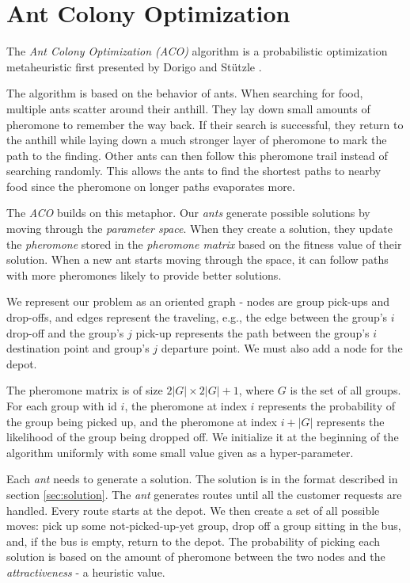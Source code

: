 
\chapter{Ant Colony Optimization}


The \textit{Ant Colony Optimization (ACO)} algorithm is a probabilistic optimization metaheuristic first presented by Dorigo and Stützle \cite{Dorigo2010}.

The algorithm is based on the behavior of ants. When searching for food, multiple ants scatter around their anthill. They lay down small amounts of pheromone to remember the way back. If their search is successful, they return to the anthill while laying down a much stronger layer of pheromone to mark the path to the finding. Other ants can then follow this pheromone trail instead of searching randomly. This allows the ants to find the shortest paths to nearby food since the pheromone on longer paths evaporates more.

The \textit{ACO} builds on this metaphor. Our \textit{ants} generate possible solutions by moving through the \textit{parameter space}. When they create a solution, they update the \textit{pheromone} stored in the \textit{pheromone matrix} based on the fitness value of their solution. When a new ant starts moving through the space, it can follow paths with more pheromones likely to provide better solutions.

We represent our problem as an oriented graph - nodes are group pick-ups and drop-offs, and edges represent the traveling, e.g., the edge between the group's $i$ drop-off and the group's $j$ pick-up represents the path between the group's $i$ destination point and group's $j$ departure point. We must also add a node for the depot.

The pheromone matrix is of size $2|G| \times 2|G| + 1$, where $G$ is the set of all groups. For each group with id $i$, the pheromone at index $i$ represents the probability of the group being picked up, and the pheromone at index $i + |G|$ represents the likelihood of the group being dropped off. We initialize it at the beginning of the algorithm uniformly with some small value given as a hyper-parameter.

Each \textit{ant} needs to generate a solution. The solution is in the format described in section \ref{sec:solution}. The \textit{ant} generates routes until all the customer requests are handled. Every route starts at the depot. We then create a set of all possible moves: pick up some not-picked-up-yet group, drop off a group sitting in the bus, and, if the bus is empty, return to the depot. The probability of picking each solution is based on the amount of pheromone between the two nodes and the \textit{attractiveness} - a heuristic value.

